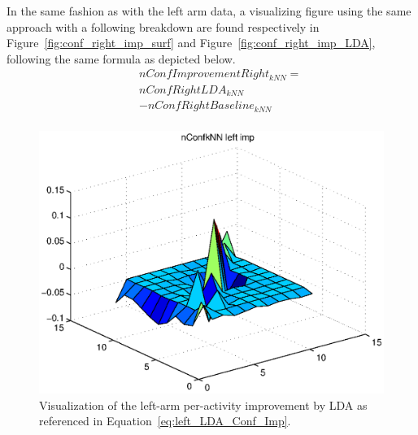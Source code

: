 \documentclass{sig-alternate}
\begin{document}
In the same fashion as with the left arm data, a visualizing figure using the same approach with a following breakdown are found respectively in Figure~\ref{fig:conf_right_imp_surf} and Figure~\ref{fig:conf_right_imp_LDA}, following the same formula as depicted below.\\[1em]
\begin{equation}\label{eq:right_LDA_Conf_Imp}
\begin{array}{lcl}
&& nConfImprovementRight_{kNN} = \\
&& nConfRightLDA_{kNN}\\
&&- nConfRightBaseline_{kNN}\\
\end{array}
\end{equation}

\begin{figure}
  \centering
  \includegraphics[scale=0.4]{./matlab_output/nConfkNN_left_imp_LDA_2.eps}
  \caption{Visualization of the left-arm per-activity improvement by LDA as referenced in Equation~\ref{eq:left_LDA_Conf_Imp}.}
  \label{fig:conf_left_imp_surf}
\end{figure}
\end{document}
